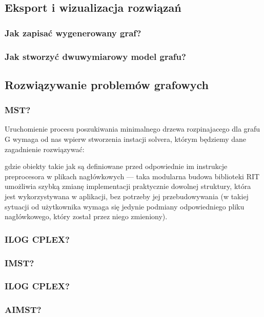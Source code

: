\subsection{Eksport i wizualizacja rozwiązań}

\subsubsection{Jak zapisać wygenerowany graf?}

\subsubsection{Jak stworzyć dwuwymiarowy model grafu?}

\subsection{Rozwiązywanie problemów grafowych}

\subsubsection{MST?}


Uruchomienie procesu poszukiwania minimalnego drzewa rozpinajacego dla grafu G wymaga od nas wpierw stworzenia instacji solvera, którym będziemy dane zagadnienie rozwiązywać:


gdzie obiekty takie jak są definiowane przed odpowiednie im instrukcje preprocesora w plikach nagłówkowych --- taka modularna budowa biblioteki RIT umożliwia szybką zmianę implementacji praktycznie dowolnej struktury, która jest wykorzystywana w aplikacji, bez potrzeby jej przebudowywania (w takiej sytuacji od użytkownika wymaga się jedynie podmiany odpowiedniego pliku nagłówkowego, który został przez niego zmieniony). 

\subsubsection{ILOG CPLEX?}

\subsubsection{IMST?}

\subsubsection{ILOG CPLEX?}

\subsubsection{AIMST?}

